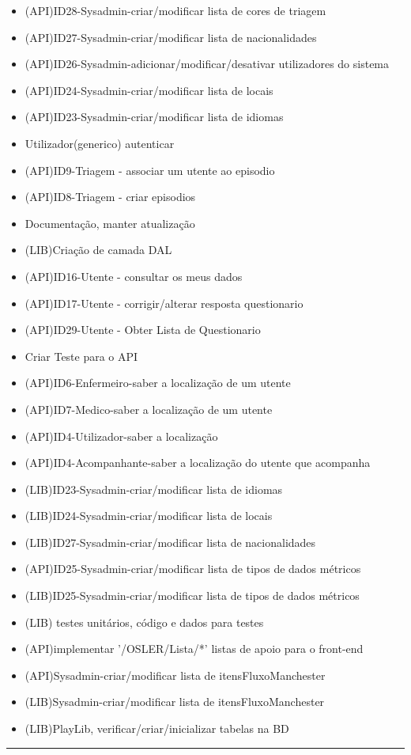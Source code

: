 \begin{itemize}
	\item (API)ID28-Sysadmin-criar/modificar lista de cores de triagem
	\item (API)ID27-Sysadmin-criar/modificar lista de nacionalidades
	\item (API)ID26-Sysadmin-adicionar/modificar/desativar utilizadores do sistema
	\item (API)ID24-Sysadmin-criar/modificar lista de locais
	\item (API)ID23-Sysadmin-criar/modificar lista de idiomas
	\item Utilizador(generico) autenticar
	\item (API)ID9-Triagem - associar um utente ao episodio 
	\item (API)ID8-Triagem - criar episodios
	\item Documentação, manter atualização
	\item (LIB)Criação de camada DAL
	\item (API)ID16-Utente - consultar os meus dados
	\item (API)ID17-Utente - corrigir/alterar resposta questionario
	\item (API)ID29-Utente - Obter Lista de Questionario
	\item Criar Teste para o API
	\item (API)ID6-Enfermeiro-saber a localização de um utente
	\item (API)ID7-Medico-saber a localização de um utente
	\item (API)ID4-Utilizador-saber a localização
	\item (API)ID4-Acompanhante-saber a localização do utente que acompanha
	\item (LIB)ID23-Sysadmin-criar/modificar lista de idiomas
	\item (LIB)ID24-Sysadmin-criar/modificar lista de locais
	\item (LIB)ID27-Sysadmin-criar/modificar lista de nacionalidades
	\item (API)ID25-Sysadmin-criar/modificar lista de tipos de dados métricos
	\item (LIB)ID25-Sysadmin-criar/modificar lista de tipos de dados métricos
	\item (LIB) testes unitários, código e dados para testes
	\item (API)implementar '/OSLER/Lista/*' listas de apoio para o front-end
	\item (API)Sysadmin-criar/modificar lista de itensFluxoManchester
	\item (LIB)Sysadmin-criar/modificar lista de itensFluxoManchester
	\item (LIB)PlayLib, verificar/criar/inicializar tabelas na BD
\end{itemize}


\noindent \rule{\linewidth}{0.4pt}
\newline